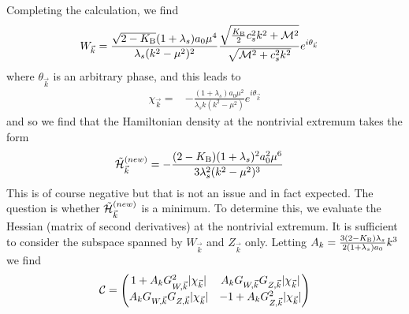 \documentclass[twocolumn,prd,preprintnumbers,amsmath,amssymb,nofootinbib,superscriptaddress]{revtex4-1}
\newcommand{\lambdas}{\lambda_s}
\newcommand{\Mcal}{{\cal M}}
\newcommand{\Ccal}{{\cal C}}
\newcommand{\Hcal}{{\cal H}}
\newcommand{\KB}{\ensuremath{K_{{\rm B}}}}
\begin{document}
Completing the calculation, we find
\begin{align}
  W_{\vec{k}}  &=  \frac{\sqrt{2-\KB} (1+\lambdas) a_0 \mu^4 }{\lambdas (k^2 - \mu^2)^2} \frac{\sqrt{\frac{\KB}{2}  c_s^2 k^2  +  \Mcal^2 } }{ \sqrt{\Mcal^2 + c_s^2 k^2}} e^{i\theta_{\vec{k}}}
\end{align}
where $\theta_{\vec{k}}$ is an arbitrary phase, and this leads to 
\begin{align}
\chi_{\vec{k}} =&- \frac{ (1+\lambdas) a_0 \mu^2 }{\lambdas k (k^2 - \mu^2)}  e^{i\theta_{\vec{k}}}
\label{chi_naive}
\end{align}
and so we find that the Hamiltonian density at the nontrivial extremum takes the form
\begin{align}
\tilde{\Hcal}^{(new)}_{\vec{k}} &=  - \frac{(2-\KB) (1+\lambdas)^2 a_0^2 \mu^6 }{3\lambdas^2 (k^2 - \mu^2)^3} 
\label{Hcal_nontrivial}
\end{align}
This is of course negative but that is not an issue and in fact expected. The question is whether $\tilde{\Hcal}^{(new)}_{\vec{k}}$ is a minimum. 
To determine this, we evaluate the Hessian (matrix of second derivatives) at the nontrivial extremum. It is sufficient to consider the subspace spanned by $W_{\vec{k}}$ 
and $Z_{\vec{k}}$ only. %
Letting $A_k = \frac{3(2-\KB)\lambdas}{2(1+\lambdas) a_0} k^3 $ we find
\begin{align}
\Ccal  = \begin{pmatrix}
  1 + A_k  G_{W,\vec{k}}^2  |\chi_{\vec{k}}|
  &
A_k G_{W,\vec{k}} G_{Z,\vec{k}}   |\chi_{\vec{k}}|
\\
A_k G_{W,\vec{k}} G_{Z,\vec{k}}   |\chi_{\vec{k}}|
  & - 1 +  
A_k  G_{Z,\vec{k}}^2  |\chi_{\vec{k}}|
\end{pmatrix}
\end{align}
\end{document}
